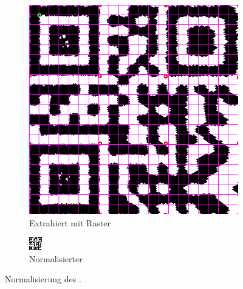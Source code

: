 \begin{figure}[h]
\centering
\begin{subfigure}[t]{0.45\textwidth}
\centering
\includegraphics[scale=0.25]{images/gitter.png}
\caption{Extrahiert mit Raster}
\end{subfigure}
\begin{subfigure}[t]{0.45\textwidth}
\centering
\includegraphics[scale=5.5]{images/qrcode-adler.png}
\caption{Normalisierter \QRCode}
\label{fig:final}
\end{subfigure}
\caption{Normalisierung des \QRCodes.}
\end{figure}

